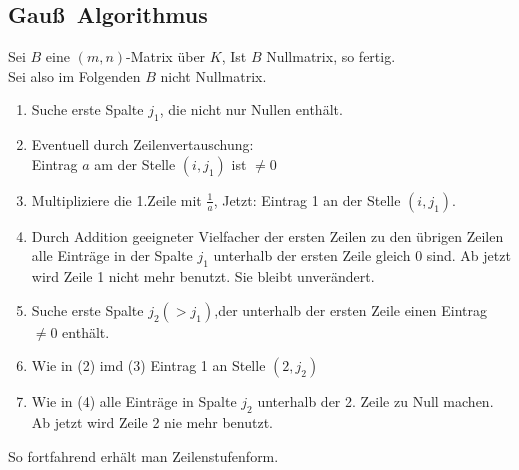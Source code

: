 \subsection[Algorithmus zur Transformation einer Matrix auf Zeilenstufenform mit elementaren Zeilenumformungen]{Gau\ss\ Algorithmus}\label{sec:9.10}
Sei $B$ eine $(m,n)$-Matrix über $K$, Ist $B$ Nullmatrix, so fertig.\\
Sei also im Folgenden $B$ nicht Nullmatrix.
\begin{enumerate}[(1)]
\item Suche erste Spalte $j_1$, die nicht nur Nullen enthält.
\item Eventuell durch Zeilenvertauschung:\\
Eintrag $a$ am der Stelle $(i,j_1)$ ist $\ne 0$
\item Multipliziere die 1.Zeile mit $\frac{1}{a}$, Jetzt: Eintrag 1 an der Stelle $(i,j_1)$.
\item Durch Addition geeigneter Vielfacher der ersten Zeilen zu den übrigen Zeilen alle Einträge in der Spalte $j_1$ unterhalb der ersten Zeile gleich 0 sind.
Ab jetzt wird Zeile 1 nicht mehr benutzt. Sie bleibt unverändert.
\item Suche erste Spalte $j_2 (> j_1)$,der unterhalb der ersten Zeile einen Eintrag $\ne 0$ enthält.
\item Wie in (2) imd (3) Eintrag 1 an Stelle $(2,j_2)$
\item Wie in (4) alle Einträge in Spalte $j_2$ unterhalb der 2. Zeile zu Null machen.\\
Ab jetzt wird Zeile 2 nie mehr benutzt.
\end{enumerate}
So fortfahrend erhält man Zeilenstufenform.
